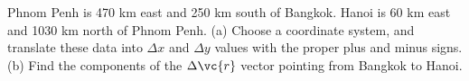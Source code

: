 Phnom Penh is 470 km east and 250 km south of Bangkok.
Hanoi is 60 km east and 1030 km north of Phnom Penh.\hwendpart
 (a)
Choose a coordinate system, and translate these data into
$\Delta x$ and $\Delta y$ values with the proper plus and
minus signs.\hwendpart
 (b) Find the components of the $\Delta \vc{r}$
vector pointing from Bangkok to Hanoi.\answercheck\hwendpart
